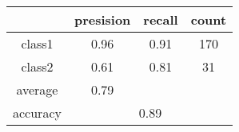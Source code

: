 
    \begin{tabular}{ | c | c | c | c | }
	\hline
	         &presision & recall & count \\ \hline
	class1   & 0.96    & 0.91  & 170 \\ \hline
	class2   & 0.61    & 0.81  & 31 \\ \hline
	average  & 0.79    &        &       \\
	\hline
	accuracy & \multicolumn{3}{c|}{0.89}\\
	\hline
    \end{tabular}